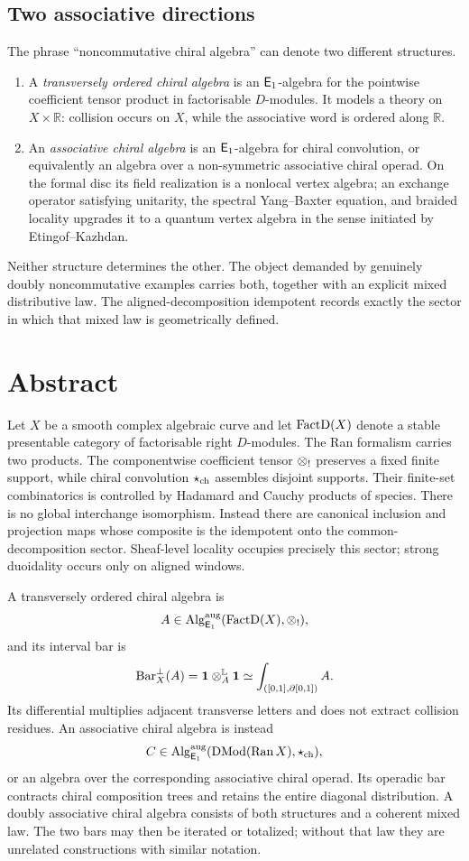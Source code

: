 \section*{Two associative directions}
The phrase ``noncommutative chiral algebra'' can denote two different
structures.
\begin{enumerate}
\item A \emph{transversely ordered chiral algebra} is an \(\mathsf E_1\)-algebra for the pointwise coefficient tensor product in factorisable \(D\)-modules.  It models a theory on \(X\times\mathbb R\): collision occurs on \(X\), while the associative word is ordered along \(\mathbb R\).
\item An \emph{associative chiral algebra} is an \(\mathsf E_1\)-algebra for chiral convolution, or equivalently an algebra over a non-symmetric associative chiral operad.  On the formal disc its field realization is a nonlocal vertex algebra; an exchange operator satisfying unitarity, the spectral Yang--Baxter equation, and braided locality upgrades it to a quantum vertex algebra in the sense initiated by Etingof--Kazhdan.
\end{enumerate}
Neither structure determines the other.  The object demanded by genuinely doubly noncommutative examples carries both, together with an explicit mixed distributive law.  The aligned-decomposition idempotent records exactly the sector in which that mixed law is geometrically defined.

\chapter*{Abstract}
Let \(X\) be a smooth complex algebraic curve and let \(\operatorname{FactD}(X)\) denote a stable presentable category of factorisable right \(D\)-modules.  The Ran formalism carries two products.  The componentwise coefficient tensor \(\mathbin{\otimes_{!}}\) preserves a fixed finite support, while chiral convolution \(\mathbin{\star_{\mathrm{ch}}}\) assembles disjoint supports.  Their finite-set combinatorics is controlled by Hadamard and Cauchy products of species.  There is no global interchange isomorphism.  Instead there are canonical inclusion and projection maps whose composite is the idempotent onto the common-decomposition sector.  Sheaf-level locality occupies precisely this sector; strong duoidality occurs only on aligned windows.

A transversely ordered chiral algebra is
\[
 A\in \operatorname{Alg}^{\mathrm{aug}}_{\mathsf E_1}(\operatorname{FactD}(X),\mathbin{\otimes_{!}}),
\]
and its interval bar is
\[
 \operatorname{Bar}_X^{\perp}(A)=\mathbf 1\mathbin{\otimes}_A^{\mathbb L}\mathbf 1
 \simeq \int_{([0,1],\partial[0,1])}A.
\]
Its differential multiplies adjacent transverse letters and does not extract collision residues.  An associative chiral algebra is instead
\[
 C\in \operatorname{Alg}^{\mathrm{aug}}_{\mathsf E_1}(\operatorname{DMod}(\operatorname{Ran} X),\mathbin{\star_{\mathrm{ch}}}),
\]
or an algebra over the corresponding associative chiral operad.  Its operadic bar contracts chiral composition trees and retains the entire diagonal distribution.  A doubly associative chiral algebra consists of both structures and a coherent mixed law.  The two bars may then be iterated or totalized; without that law they are unrelated constructions with similar notation.

